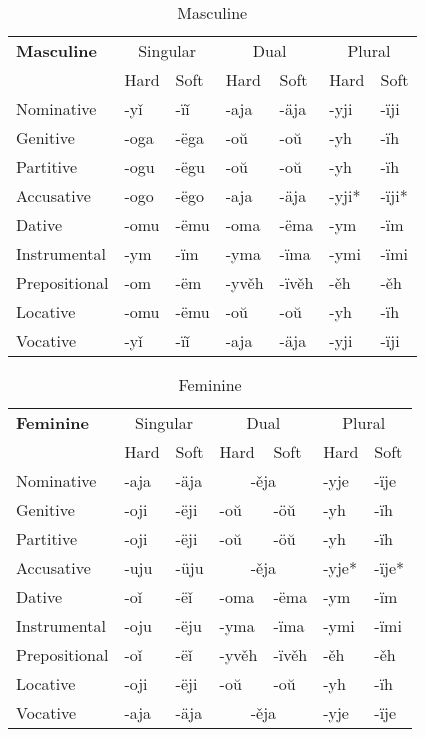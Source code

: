 \begin{table}[!htb]
	\caption{Masculine}
	\begin{tabular}{lllllll}
		\textbf{Masculine}       
		& \multicolumn{2}{c}{Singular} 
		& \multicolumn{2}{c}{Dual} 
		& \multicolumn{2}{c}{Plural} \\
		& Hard   & Soft  & Hard   & Soft   & Hard  & Soft \\
		Nominative    & -yǐ & -ïǐ     
		& -aja  & -äja        
		& -yji & -ïji \\
		Genitive      & -oga & -ëga 
		& -oŭ & -oŭ
		& -yh & -ïh \\
		Partitive     & -ogu & -ëgu 
		& -oŭ & -oŭ
		& -yh & -ïh \\
		Accusative    & -ogo & -ëgo     
		& -aja & -äja
		& -yji* & -ïji*  \\
		Dative		  & -omu & -ëmu
		& -oma & -ëma 
		& -ym & -ïm \\  
		Instrumental  & -ym & -ïm     
		& -yma & -ïma   
		& -ymi & -ïmi \\
		Prepositional & -om & -ëm  
		& -yvěh & -ïvěh     
		& -ěh & -ěh \\
		Locative      & -omu & -ëmu      
		& -oŭ & -oŭ
		& -yh & -ïh \\
		Vocative       & -yǐ & -ïǐ     
		& -aja  & -äja        
		& -yji & -ïji 
	\end{tabular}
\end{table}


\begin{table}[!htb]
	\caption{Feminine}
	\begin{tabular}{lllllll}
		\textbf{Feminine}       
		& \multicolumn{2}{c}{Singular} 
		& \multicolumn{2}{c}{Dual} 
		& \multicolumn{2}{c}{Plural} \\
		& Hard   & Soft  & Hard   & Soft   & Hard  & Soft \\
		Nominative    & -aja & -äja     
		& \multicolumn{2}{c}{-ěja}        
		& -yje & -ïje \\
		Genitive      & -oji & -ëji
		& -oŭ & -öŭ
		& -yh & -ïh \\
		Partitive    & -oji & -ëji
		& -oŭ & -öŭ
		& -yh & -ïh \\
		Accusative    & -uju & -üju     
		& \multicolumn{2}{c}{-ěja} 
		& -yje* & -ïje*  \\
		Dative		  & -oǐ & -ëǐ
		& -oma & -ëma 
		& -ym & -ïm \\  
		Instrumental  & -oju & -ëju
		& -yma & -ïma   
		& -ymi & -ïmi \\
		Prepositional  & -oǐ & -ëǐ
		& -yvěh & -ïvěh     
		& -ěh & -ěh \\
		Locative      & -oji & -ëji      
		& -oŭ & -oŭ
		& -yh & -ïh \\
		Vocative      & -aja & -äja     
		& \multicolumn{2}{c}{-ěja}        
		& -yje & -ïje 
	\end{tabular}
\end{table}


